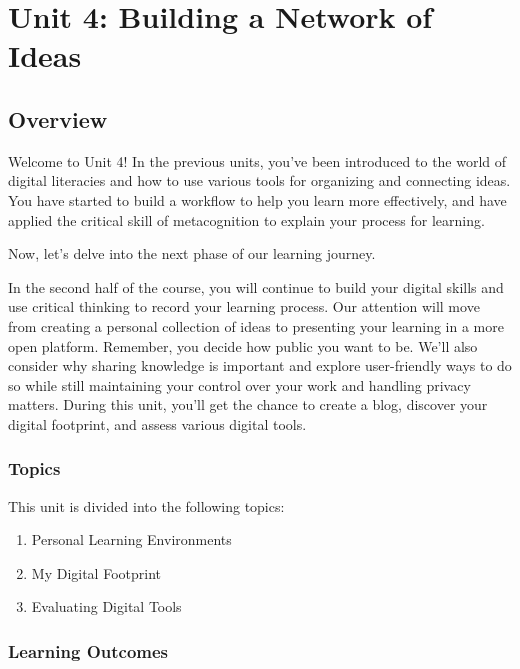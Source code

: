 \documentclass[
]{book}
\providecommand{\tightlist}{%
  \setlength{\itemsep}{0pt}\setlength{\parskip}{0pt}}
\theoremstyle{definition}
\theoremstyle{definition}
\theoremstyle{definition}
\theoremstyle{definition}
\theoremstyle{remark}
\begin{document}
\hypertarget{unit-4-building-a-network-of-ideas}{%
\chapter{Unit 4: Building a Network of Ideas}\label{unit-4-building-a-network-of-ideas}}

\hypertarget{overview-3}{%
\section*{Overview}\label{overview-3}}

Welcome to Unit 4! In the previous units, you've been introduced to the world of digital literacies and how to use various tools for organizing and connecting ideas. You have started to build a workflow to help you learn more effectively, and have applied the critical skill of metacognition to explain your process for learning.

Now, let's delve into the next phase of our learning journey.

In the second half of the course, you will continue to build your digital skills and use critical thinking to record your learning process. Our attention will move from creating a personal collection of ideas to presenting your learning in a more open platform. Remember, you decide how public you want to be. We'll also consider why sharing knowledge is important and explore user-friendly ways to do so while still maintaining your control over your work and handling privacy matters. During this unit, you'll get the chance to create a blog, discover your digital footprint, and assess various digital tools.

\hypertarget{topics-3}{%
\subsection*{Topics}\label{topics-3}}

This unit is divided into the following topics:

\begin{enumerate}
\def\labelenumi{\arabic{enumi}.}
\tightlist
\item
  Personal Learning Environments
\item
  My Digital Footprint
\item
  Evaluating Digital Tools
\end{enumerate}

\hypertarget{learning-outcomes-3}{%
\subsection*{Learning Outcomes}\label{learning-outcomes-3}}
\end{document}
